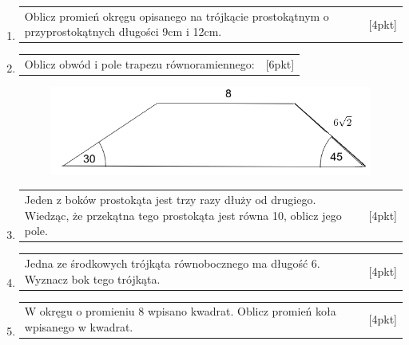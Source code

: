 \documentclass[12pt,a4paper]{article}
\begin{document}
\begin{enumerate}[1.]
		\newpage
		
		\item  \begin{tabular}{p{13cm} r}	%
			Oblicz promień okręgu opisanego na trójkącie prostokątnym o przyprostokątnych długości 9cm i 12cm.&[4pkt]\\ 
		\end{tabular}
		
		\item  \begin{tabular}{p{13cm} r}	%
			Oblicz obwód i pole trapezu równoramiennego: &[6pkt]\\ 
		\end{tabular}
		\begin{figure}[h]
			\includegraphics[scale=0.8]{tp3}
		\end{figure}
	
		\item  \begin{tabular}{p{13cm} r}
			Jeden z boków prostokąta jest trzy razy dłuży od drugiego. Wiedząc, że przekątna tego prostokąta jest równa 10, oblicz jego pole. &[4pkt]\\
		\end{tabular}
	
		\item  \begin{tabular}{p{13cm} r}
			Jedna ze środkowych trójkąta równobocznego ma długość 6. Wyznacz bok tego trójkąta. &[4pkt]\\ 
		\end{tabular}
	
		\item  \begin{tabular}{p{13cm} r}
			W okręgu o promieniu 8 wpisano kwadrat. Oblicz promień koła wpisanego w kwadrat. &[4pkt]\\ 
		\end{tabular}
	\end{enumerate}
\end{document}
